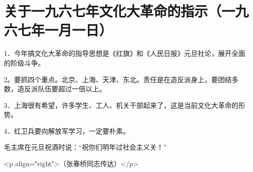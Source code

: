 \section[关于一九六七年文化大革命的指示（一九六七年一月一日）]{关于一九六七年文化大革命的指示（一九六七年一月一日）}


1．今年搞文化大革命的指导思想是《红旗》和《人民日报》元旦社论，展开全面的阶级斗争。

2。要抓四个重点。北京、上海、天津、东北。责任是在造反派身上，要团结多数，造反派队伍要超过一倍以上。

3．上海很有希望，许多学生、工人、机关干部起来了，这是当前文化大革命的形势。

4．红卫兵要向解放军学习，一定要朴素。

毛主席在元旦祝酒时说：“祝你们明年过社会主义关！”

<p align="right">（张春桥同志传达）</p>


